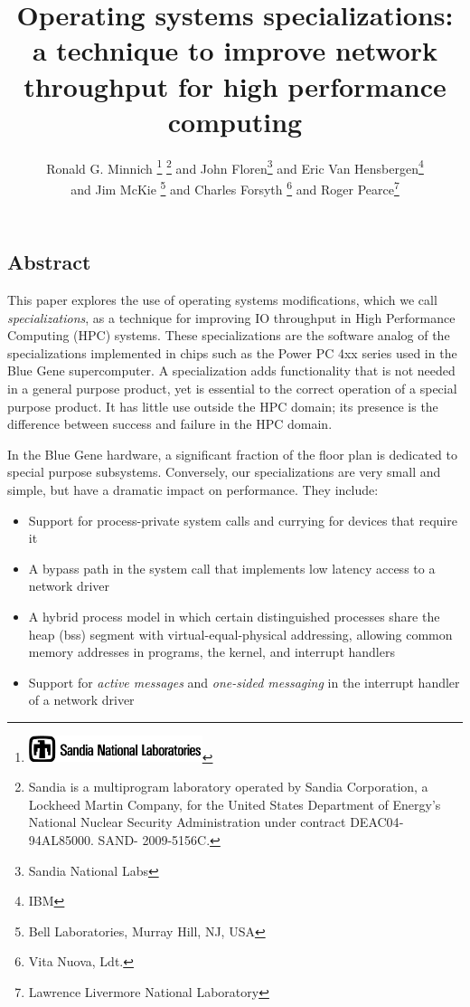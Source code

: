 \documentclass[letterpaper,twocolumn,10pt]{article}
\date{}
\begin{document}
\author{Ronald G. Minnich%
\thanks{\protect\includegraphics[height=0.3in]{thunderchicken}%
}%
\thanks{Sandia is a multiprogram laboratory operated by Sandia Corporation, a Lockheed Martin Company, for the United States Department of Energy’s National Nuclear Security Administration under contract DE­AC04­94AL85000. SAND- 2009-5156C.}  
and John Floren\thanks{Sandia National Labs} 
and Eric Van Hensbergen\thanks{IBM} 
\\ 
and Jim McKie
\thanks{Bell Laboratories, Murray Hill, NJ, USA }
and Charles Forsyth
\thanks{Vita Nuova, Ldt.} and Roger Pearce\thanks{Lawrence Livermore National Laboratory}
}

\title{\Large \bf Operating systems specializations: a technique to improve network  throughput for high performance computing}
\maketitle
\thispagestyle{empty}
\pagestyle{empty}
\subsection*{Abstract}
This paper explores the use of operating systems modifications, which we call {\em specializations}, as a technique for improving IO throughput in High Performance Computing (HPC) systems. 
These specializations are the software analog of the specializations implemented in chips such as the Power PC 4xx series used in the Blue Gene supercomputer. A 
specialization adds functionality that is not needed in a general purpose product, yet is essential to the correct operation of a special purpose product. It has  little use 
outside the HPC domain; its presence is the difference between success and failure in the HPC domain. 

In the Blue Gene hardware, a significant fraction of the floor plan is dedicated to special purpose subsystems. Conversely, our specializations are very small and simple, but have a dramatic impact on performance. 
They include: 
\begin{itemize}
\item Support for process-private system calls and currying for devices that require it
\item A bypass path in the system call that implements low latency access to a network driver
\item A hybrid process model in which certain distinguished processes share the heap (bss) segment with virtual-equal-physical addressing, allowing common memory addresses in programs, the kernel, and interrupt handlers
\item Support for {\em active messages} and {\em one-sided messaging} in the interrupt handler of a network driver
\end{itemize}
\end{document}
